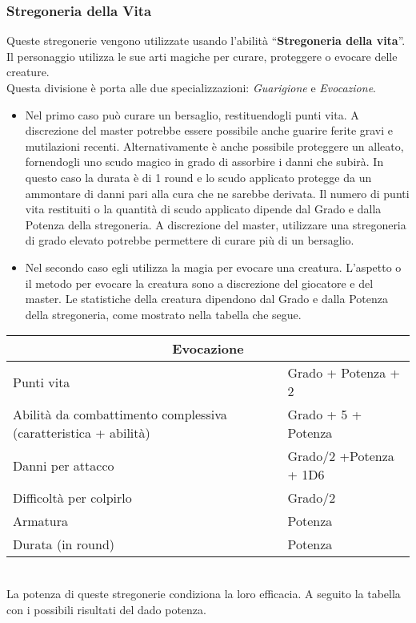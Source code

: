 \documentclass[../manuale_main.tex]{subfiles}
\begin{document}
\subsubsection{Stregoneria della Vita}
Queste stregonerie vengono utilizzate usando l'abilità ``\textbf{Stregoneria della vita}''.\\
Il personaggio utilizza le sue arti magiche per curare, proteggere o evocare delle creature. \\
Questa divisione è porta alle due specializzazioni: \emph{Guarigione} e \emph{Evocazione}.\\
\begin{itemize}
\item Nel primo caso può curare un bersaglio, restituendogli punti vita. A discrezione del master potrebbe essere possibile anche guarire ferite gravi e mutilazioni recenti. Alternativamente è anche possibile proteggere un alleato, fornendogli uno scudo magico in grado di assorbire i danni che subirà. In questo caso la durata è di 1 round e lo scudo applicato protegge da un ammontare di danni pari alla cura che ne sarebbe derivata. Il numero di punti vita restituiti o la quantità di scudo applicato dipende dal Grado e dalla Potenza della stregoneria. A discrezione del master, utilizzare una stregoneria di grado elevato potrebbe permettere di curare più di un bersaglio.
\item Nel secondo caso egli utilizza la magia per evocare una creatura. L'aspetto o il metodo per evocare la creatura sono a discrezione del giocatore e del master. Le statistiche della creatura dipendono dal Grado e dalla Potenza della stregoneria, come mostrato nella tabella che segue.
\end{itemize}

\begin{tabular}{| l | l |}
\hline
\multicolumn{2}{|c|}{\textbf{Evocazione}}\\
\hline
Punti vita&Grado + Potenza + 2\\
Abilità da combattimento complessiva (caratteristica + abilità)&Grado + 5 + Potenza\\
Danni per attacco&Grado/2 +Potenza + 1D6\\
Difficoltà per colpirlo&Grado/2 \\
Armatura&Potenza\\
Durata (in round)& Potenza\\
\hline
\end{tabular}\\

La potenza di queste stregonerie condiziona la loro efficacia. A seguito la tabella con i possibili risultati del dado potenza.\\
\end{document}
